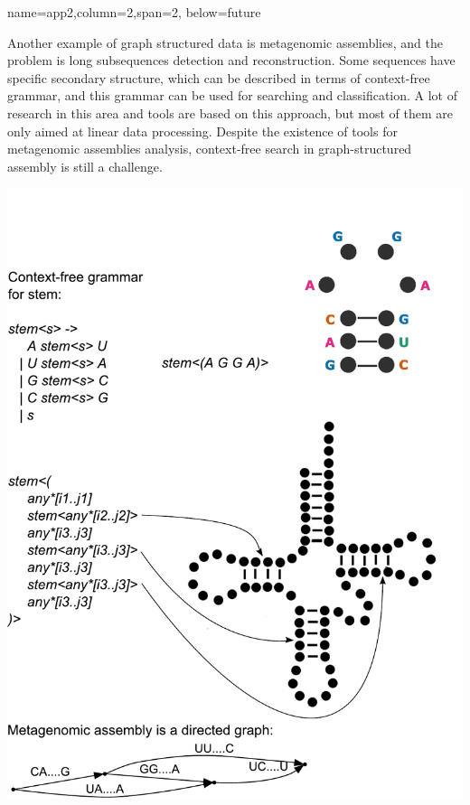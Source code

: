 \documentclass[a0paper,portrait]{baposter}
\begin{document}
\begin{poster}
{name=app2,column=2,span=2, below=future}
{
Another example of graph structured data is metagenomic assemblies, and the problem is long subsequences detection and reconstruction.
Some sequences have specific secondary structure, which can be described in terms of context-free grammar, and this grammar can be used for searching and classification.
A lot of research in this area and tools are based on this approach, but most of them are only aimed at linear data processing.
Despite the existence of tools for metagenomic assemblies analysis, context-free search in graph-structured assembly is still a challenge.
\begin{center}
\includegraphics[width=\textwidth]{secondaryStructure.pdf}
\end{center}

}




\end{poster}
\end{document}

